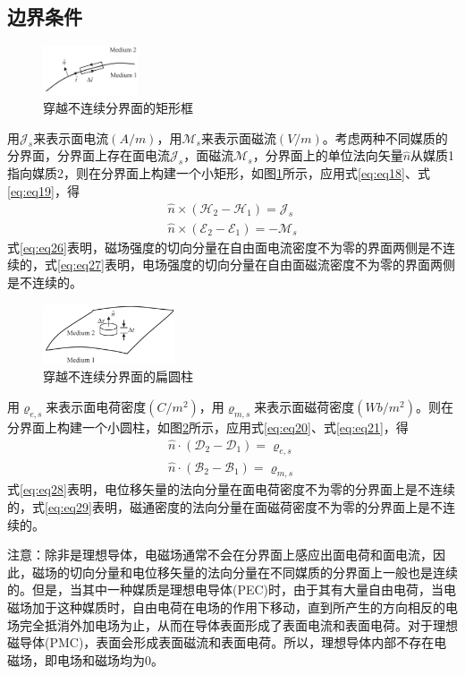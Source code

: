 \documentclass{article}
\numberwithin{equation}{section}
\renewcommand{\vec}[1]{\boldsymbol{#1}}
\begin{document}
\subsection{边界条件}
\begin{figure}[ht]
    \centering
    \includegraphics[width=0.25\textwidth]{穿越不连续分界面的矩形框.PNG}
    \caption{穿越不连续分界面的矩形框}
    \label{fig:fig15}
\end{figure}
用$\vec{\mathcal{J}}_s$来表示面电流$(A/m)$，用$\vec{\mathcal{M}}_s$来表示面磁流$(V/m)$。考虑两种不同媒质的分界面，分界面上存在面电流$\vec{\mathcal{J}}_s$，面磁流$\vec{\mathcal{M}}_s$，分界面上的单位法向矢量$\hat{n}$从媒质1指向媒质2，则在分界面上构建一个小矩形，如图\ref{fig:fig15}所示，应用式\ref{eq:eq18}、式\ref{eq:eq19}，得
\begin{align}
    \label{eq:eq26}
    \hat{n} \times (\vec{\mathcal{H}}_2-\vec{\mathcal{H}}_1)=\vec{\mathcal{J}}_s \\
    \label{eq:eq27}
    \hat{n} \times (\vec{\mathcal{E}}_2-\vec{\mathcal{E}}_1)=-\vec{\mathcal{M}}_s
\end{align}
式\ref{eq:eq26}表明，磁场强度的切向分量在自由面电流密度不为零的界面两侧是不连续的，式\ref{eq:eq27}表明，电场强度的切向分量在自由面磁流密度不为零的界面两侧是不连续的。
\begin{figure}[ht]
    \centering
    \includegraphics[width=0.35\textwidth]{穿越不连续分界面的扁圆柱.PNG}
    \caption{穿越不连续分界面的扁圆柱}
    \label{fig:fig16}
\end{figure}
\par
用$\varrho _{e,s}$来表示面电荷密度$(C/m^2)$，用$\varrho _{m,s}$来表示面磁荷密度$(Wb/m^2)$。则在分界面上构建一个小圆柱，如图\ref{fig:fig16}所示，应用式\ref{eq:eq20}、式\ref{eq:eq21}，得
\begin{align}
    \label{eq:eq28}
    \hat{n} \cdot (\vec{\mathcal{D}}_2-\vec{\mathcal{D}}_1)=\varrho _{e,s} \\
    \label{eq:eq29}
    \hat{n} \cdot (\vec{\mathcal{B}}_2-\vec{\mathcal{B}}_1)=\varrho _{m,s}
\end{align}
式\ref{eq:eq28}表明，电位移矢量的法向分量在面电荷密度不为零的分界面上是不连续的，式\ref{eq:eq29}表明，磁通密度的法向分量在面磁荷密度不为零的分界面上是不连续的。\par
注意：除非是理想导体，电磁场通常不会在分界面上感应出面电荷和面电流，因此，磁场的切向分量和电位移矢量的法向分量在不同媒质的分界面上一般也是连续的。但是，当其中一种媒质是理想电导体(PEC)时，由于其有大量自由电荷，当电磁场加于这种媒质时，自由电荷在电场的作用下移动，直到所产生的方向相反的电场完全抵消外加电场为止，从而在导体表面形成了表面电流和表面电荷。对于理想磁导体(PMC)，表面会形成表面磁流和表面电荷。所以，理想导体内部不存在电磁场，即电场和磁场均为0。
\end{document}
